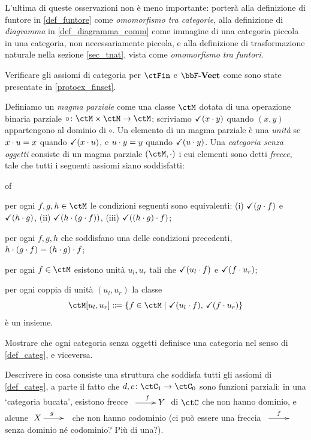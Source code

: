 L'ultima di queste osservazioni non è meno importante: porterà alla definizione di funtore in \ref{def_funtore} come \emph{omomorfismo tra categorie}, alla definizione di \emph{diagramma} in \ref{def_diagramma_comm} come immagine di una categoria piccola in una categoria, non necessariamente piccola, e alla definizione di trasformazione naturale nella sezione \ref{sec_tnat}, vista come \emph{omomorfismo tra funtori}.
\begin{esercizi}
 \item \label{jgdasoh_4} Verificare gli assiomi di categoria per \(\ctFin\) e \(\ctVect\) come sono state presentate in \ref{protoex_finset}.
 \item \label{jgdasoh_1} Definiamo un \emph{magma parziale} come una classe \(\ctM\) dotata di una operazione binaria parziale \(\circ \colon \ctM\times\ctM\to\ctM\); scriviamo \(\checkmark(x\cdot y)\) quando \((x,y)\) appartengono al dominio di \(\circ\). Un elemento di un magma parziale è una \emph{unità} se \(x\cdot u = x\) quando \(\checkmark(x\cdot u)\), e \(u\cdot y = y\) quando \(\checkmark(u\cdot y)\). Una \emph{categoria senza oggetti} consiste di un magma parziale \((\ctM,\cmp)\) i cui elementi sono detti \emph{frecce}, tale che tutti i seguenti assiomi siano soddisfatti:
 \begin{enumtag}{of}
  \item per ogni \(f,g,h\in\ctM\) le condizioni seguenti sono equivalenti: (i) \(\checkmark(g\cdot f)\) e \(\checkmark(h\cdot g)\), (ii) \(\checkmark(h\cdot (g\cdot f))\), (iii) \(\checkmark((h\cdot g)\cdot f)\);
  \item per ogni \(f,g,h\) che soddisfano una delle condizioni precedenti, \(h\cdot (g\cdot f) = (h\cdot g)\cdot f\);
  \item per ogni \(f\in\ctM\) esistono unità \(u_l,u_r\) tali che \(\checkmark(u_l\cdot f)\) e \(\checkmark(f\cdot u_r)\);
  \item per ogni coppia di unità \((u_l,u_r)\) la classe
  \[\ctM[u_l,u_r] \defeq  \{f\in\ctM\mid \checkmark(u_l\cmp f),\,\checkmark(f\cmp u_r)\}\]
  è un insieme.
 \end{enumtag}
 Mostrare che ogni categoria senza oggetti definisce una categoria nel senso di \ref{def_categ}, e viceversa.
 \item \label{jgdasoh_2} Descrivere in cosa consiste una struttura che soddisfa tutti gli assiomi di \ref{def_categ}, a parte il fatto che \(d,c \colon \ctC_1\to\ctC_0\) sono funzioni parziali: in una `categoria bucata', esistono frecce \(\xymatrix{{} \ar[r]^f & Y}\) di \(\ctC\) che non hanno dominio, e alcune \(\xymatrix{X \ar[r]^g & {}}\) che non hanno codominio (ci può essere una freccia \(\xymatrix{{} \ar[r]^f & {}}\) senza dominio né codominio? Più di una?).

\end{esercizi}
